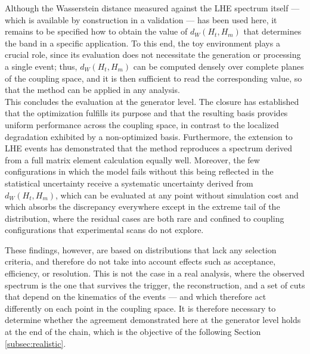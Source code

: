Although the Wasserstein distance measured against the LHE spectrum itself — which is available by construction in a validation — has been used here, it remains to be specified how to obtain the value of $d_W(H_{t},H_{m})$ that determines the band in a specific application. To this end, the toy environment plays a crucial role, since its evaluation does not necessitate the generation or processing a single event; thus, $d_W(H_{t},H_{m})$ can be computed densely over complete planes of the coupling space, and it is then sufficient to read the corresponding value, so that the method can be applied in any analysis.\\

This concludes the evaluation at the generator level. The closure has established that the optimization fulfills its purpose and that the resulting basis provides uniform performance across the coupling space, in contrast to the localized degradation exhibited by a non-optimized basis. Furthermore, the extension to LHE events has demonstrated that the method reproduces a spectrum derived from a full matrix element calculation equally well. Moreover, the few configurations in which the model fails without this being reflected in the statistical uncertainty receive a systematic uncertainty derived from $d_W(H_{t},H_{m})$, which can be evaluated at any point without simulation cost and which absorbs the discrepancy everywhere except in the extreme tail of the distribution, where the residual cases are both rare and confined to coupling configurations that experimental scans do not explore.

These findings, however, are based on distributions that lack any selection criteria, and therefore do not take into account effects such as acceptance, efficiency, or resolution. This is not the case in a real analysis, where the observed spectrum is the one that survives the trigger, the reconstruction, and a set of cuts that depend on the kinematics of the events — and which therefore act differently on each point in the coupling space. It is therefore necessary to determine whether the agreement demonstrated here at the generator level holds at the end of the chain, which is the objective of the following Section \ref{subsec:realistic}.\\


